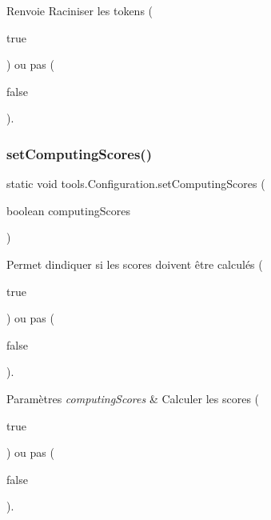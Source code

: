 \begin{DoxyReturn}{Renvoie}
Raciniser les tokens (
\begin{DoxyCode}
\textcolor{keyword}{true} 
\end{DoxyCode}
 ) ou pas (
\begin{DoxyCode}
\textcolor{keyword}{false} 
\end{DoxyCode}
 ). 
\end{DoxyReturn}
\mbox{\label{classtools_1_1Configuration_a6641e3670ab246bfda71d332407f161f}} 
\subsubsection{\texorpdfstring{set\+Computing\+Scores()}{setComputingScores()}}
{\footnotesize\ttfamily static void tools.\+Configuration.\+set\+Computing\+Scores (\begin{DoxyParamCaption}\item[{boolean}]{computing\+Scores }\end{DoxyParamCaption})\hspace{0.3cm}{\ttfamily [static]}}

Permet d\textquotesingle{}indiquer si les scores doivent être calculés (
\begin{DoxyCode}
\textcolor{keyword}{true} 
\end{DoxyCode}
 ) ou pas (
\begin{DoxyCode}
\textcolor{keyword}{false} 
\end{DoxyCode}
 ).


\begin{DoxyParams}{Paramètres}
{\em computing\+Scores} & Calculer les scores (
\begin{DoxyCode}
\textcolor{keyword}{true} 
\end{DoxyCode}
 ) ou pas (
\begin{DoxyCode}
\textcolor{keyword}{false} 
\end{DoxyCode}
 ). \\
\hline
\end{DoxyParams}
\mbox{\label{classtools_1_1Configuration_aba2fd018e507593a824d6f4c41271089}} 
